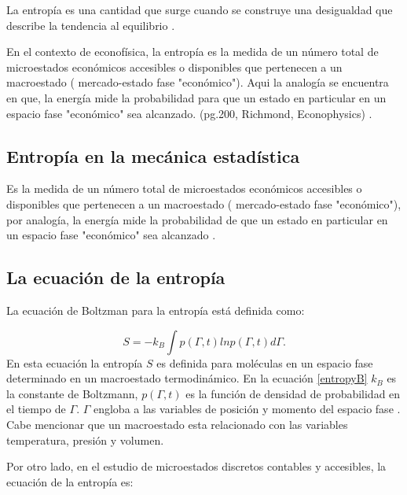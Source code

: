 La entropía es una cantidad que surge cuando se construye una desigualdad que describe la tendencia al equilibrio  \citep[][pagina 70]{keszei2011chemical}. 


En el contexto de econofísica, la entropía es la medida de un número total de microestados económicos accesibles o disponibles que pertenecen a un macroestado ( mercado-estado fase "económico"). Aqui la analogía se encuentra en que, la energía mide la probabilidad para que un estado en particular en un espacio fase "económico" sea alcanzado. (pg.200, Richmond, Econophysics) \citep{cottrell_classical_2009}.

\subsection{Entropía en la mecánica estadística} 


Es la medida de un número total de microestados económicos accesibles o disponibles que pertenecen a un macroestado ( mercado-estado fase "económico"), por analogía, la energía mide la probabilidad de que un estado en particular en un espacio fase "económico" sea alcanzado \citep{richmond}.

\subsection{La ecuación de la entropía}

La ecuación de Boltzman para la entropía está definida como:

\begin{equation}
	S = -k_B \int p(\Gamma,t) ln p(\Gamma,t) d\Gamma.
	\label{entropyB}
\end{equation}
En esta ecuación la entropía $S$ es definida para moléculas en un espacio fase determinado  en un macroestado termodinámico.
En la ecuación \ref{entropyB} $k_B$ es la constante de Boltzmann, $ p(\Gamma,t)$ es la función de densidad de probabilidad en el tiempo de $\Gamma$. $\Gamma$ engloba a las variables de posición y momento del espacio fase \citep[][pagina 13]{richmond}. Cabe mencionar que un macroestado esta relacionado con las variables temperatura, presión y volumen.
 
Por otro lado, en el estudio de microestados discretos contables y accesibles, la ecuación de la entropía es: 
 
